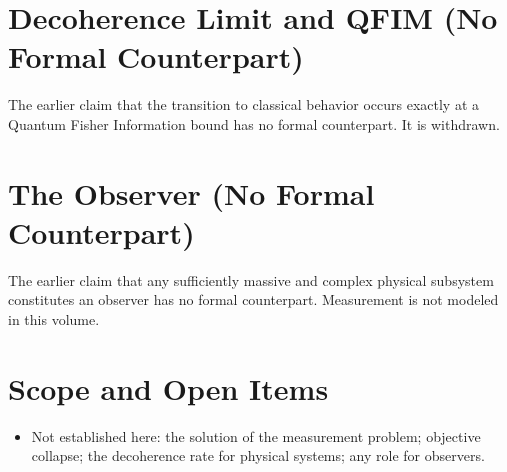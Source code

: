 \documentclass[11pt, a4paper]{article}
\begin{document}
\section{Decoherence Limit and QFIM (No Formal Counterpart)}
The earlier claim that the transition to classical behavior occurs exactly at a Quantum Fisher Information bound has no formal counterpart. It is withdrawn.

\section{The Observer (No Formal Counterpart)}
The earlier claim that any sufficiently massive and complex physical subsystem constitutes an observer has no formal counterpart. Measurement is not modeled in this volume.

\section{Scope and Open Items}
\begin{itemize}
  \item Not established here: the solution of the measurement problem; objective collapse; the decoherence rate for physical systems; any role for observers.
\end{itemize}
\end{document}
